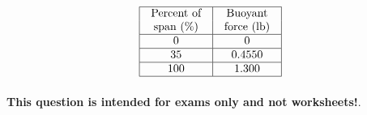 $$\vbox{\offinterlineskip
\halign{\strut
\vrule \quad\hfil # \ \hfil & 
\vrule \quad\hfil # \ \hfil \vrule \cr
\noalign{\hrule}
%
Percent of & Buoyant  \cr
%
span (\%) & force (lb) \cr
%
\noalign{\hrule}
%
0 & 0 \cr
%
\noalign{\hrule}
%
35 & 0.4550 \cr
%
\noalign{\hrule}
%
100 & 1.300 \cr
%
\noalign{\hrule}
} %
}$$ %








{\bf This question is intended for exams only and not worksheets!}.



